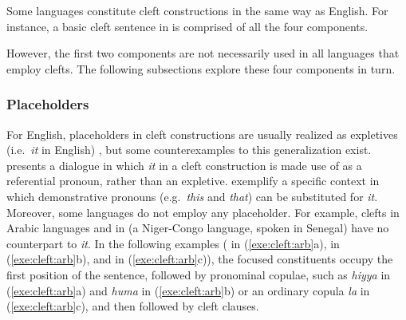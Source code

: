 \noindent Some languages constitute cleft constructions in the same
way as English.  For instance, a basic cleft sentence
 in  is comprised of all the four
components.


\noindent However, the first two components are not necessarily used
in all languages that employ clefts. The following subsections explore
these four components in turn.



\subsubsection{Placeholders}
\label{10:sssec:clefts:placeholders}


For English, placeholders in cleft constructions are
usually realized as expletives (i.e.\ \textit{it} in English)
\citep{pollard:sag:94}, but some counterexamples to this
generalization exist. \citet{kim:12a} presents a dialogue in which
\textit{it} in a cleft construction is made use of as a referential
pronoun, rather than an expletive. \citet{ han:hedberg:08} exemplify a
specific context in which demonstrative pronouns (e.g.\ \textit{this}
and \textit{that}) can be substituted for \textit{it}. Moreover, some
languages do not employ any placeholder. For example, clefts in Arabic
languages and in  (a Niger-Congo language, spoken in
Senegal) have no counterpart to \textit{it}. In the following examples
( in (\ref{exe:cleft:arb}a),  in (\ref{exe:cleft:arb}b), and  in
(\ref{exe:cleft:arb}c)), the focused constituents occupy the first
position of the sentence, followed by pronominal copulae, such as
\textit{hiyya} in (\ref{exe:cleft:arb}a) and \textit{huma} in
(\ref{exe:cleft:arb}b) or an ordinary copula \textit{la} in
(\ref{exe:cleft:arb}c), and then followed by cleft clauses.





